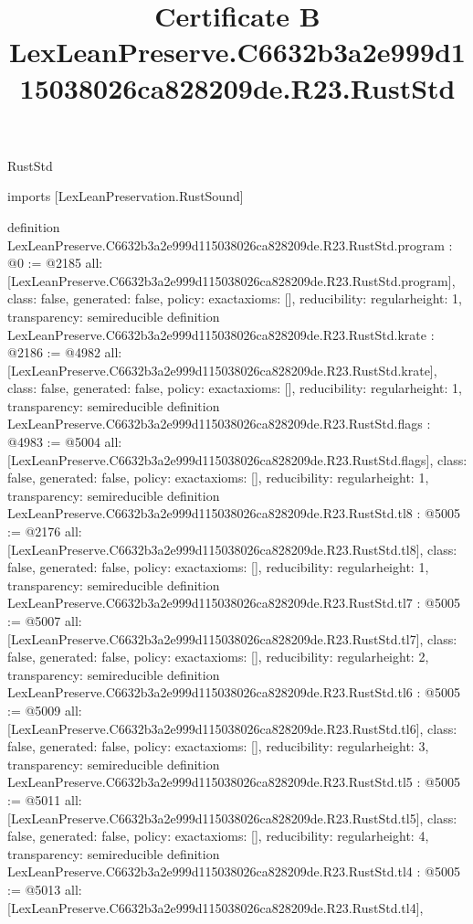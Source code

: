 \begin{lexlean}{RustStd}
\title{Certificate B LexLeanPreserve.C6632b3a2e999d115038026ca828209de.R23.RustStd}
\begin{coremodule}
imports [LexLeanPreservation.RustSound]

definition LexLeanPreserve.C6632b3a2e999d115038026ca828209de.R23.RustStd.program : @0 := @2185 {
  all: [LexLeanPreserve.C6632b3a2e999d115038026ca828209de.R23.RustStd.program],
  class: false,
  generated: false,
  policy: exact{axioms: []},
  reducibility: regular{height: 1},
  transparency: semireducible
}
definition LexLeanPreserve.C6632b3a2e999d115038026ca828209de.R23.RustStd.krate : @2186 := @4982 {
  all: [LexLeanPreserve.C6632b3a2e999d115038026ca828209de.R23.RustStd.krate],
  class: false,
  generated: false,
  policy: exact{axioms: []},
  reducibility: regular{height: 1},
  transparency: semireducible
}
definition LexLeanPreserve.C6632b3a2e999d115038026ca828209de.R23.RustStd.flags : @4983 := @5004 {
  all: [LexLeanPreserve.C6632b3a2e999d115038026ca828209de.R23.RustStd.flags],
  class: false,
  generated: false,
  policy: exact{axioms: []},
  reducibility: regular{height: 1},
  transparency: semireducible
}
definition LexLeanPreserve.C6632b3a2e999d115038026ca828209de.R23.RustStd.tl8 : @5005 := @2176 {
  all: [LexLeanPreserve.C6632b3a2e999d115038026ca828209de.R23.RustStd.tl8],
  class: false,
  generated: false,
  policy: exact{axioms: []},
  reducibility: regular{height: 1},
  transparency: semireducible
}
definition LexLeanPreserve.C6632b3a2e999d115038026ca828209de.R23.RustStd.tl7 : @5005 := @5007 {
  all: [LexLeanPreserve.C6632b3a2e999d115038026ca828209de.R23.RustStd.tl7],
  class: false,
  generated: false,
  policy: exact{axioms: []},
  reducibility: regular{height: 2},
  transparency: semireducible
}
definition LexLeanPreserve.C6632b3a2e999d115038026ca828209de.R23.RustStd.tl6 : @5005 := @5009 {
  all: [LexLeanPreserve.C6632b3a2e999d115038026ca828209de.R23.RustStd.tl6],
  class: false,
  generated: false,
  policy: exact{axioms: []},
  reducibility: regular{height: 3},
  transparency: semireducible
}
definition LexLeanPreserve.C6632b3a2e999d115038026ca828209de.R23.RustStd.tl5 : @5005 := @5011 {
  all: [LexLeanPreserve.C6632b3a2e999d115038026ca828209de.R23.RustStd.tl5],
  class: false,
  generated: false,
  policy: exact{axioms: []},
  reducibility: regular{height: 4},
  transparency: semireducible
}
definition LexLeanPreserve.C6632b3a2e999d115038026ca828209de.R23.RustStd.tl4 : @5005 := @5013 {
  all: [LexLeanPreserve.C6632b3a2e999d115038026ca828209de.R23.RustStd.tl4],
}
\end{coremodule}
\end{lexlean}
